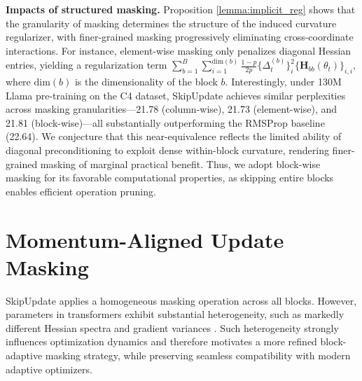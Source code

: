 \documentclass[11pt, a4paper, twocolumn, copyright, goog]{google}
\theoremstyle{plain}
\theoremstyle{definition}
\theoremstyle{remark}
\begin{document}
\textbf{Impacts of structured masking.}
Proposition \ref{lemma:implicit_reg} shows that the granularity of masking determines the structure of the induced curvature regularizer, with finer-grained masking progressively eliminating cross-coordinate interactions.
For instance, element-wise masking only penalizes diagonal Hessian entries, yielding a regularization term $\sum_{b=1}^B \sum_{i=1}^{\textrm{dim}(b)} \frac{1-p}{2p} \{ \Delta_t^{(b)} \}_{i}^2   \{ \mathbf{H}_{bb}(\theta_t) \}_{i,i},$ where $\textrm{dim}(b)$ is the dimensionality of the block $b$.
Interestingly, under 130M Llama pre-training on the C4 dataset, SkipUpdate achieves similar perplexities across masking granularities—21.78 (column-wise), 21.73 (element-wise), and 21.81 (block-wise)—all substantially outperforming the RMSProp baseline (22.64).
We conjecture that this near-equivalence reflects the limited ability of diagonal preconditioning to exploit dense within-block curvature, rendering finer-grained masking of marginal practical benefit.
Thus, we adopt block-wise masking for its favorable computational properties, as skipping entire blocks enables efficient operation pruning.







\section{Momentum-Aligned Update Masking} \label{sec:mainsection}
SkipUpdate applies a homogeneous masking operation across all blocks.
However, parameters in transformers exhibit substantial heterogeneity, such as markedly different Hessian spectra \citep{zhang2024transformers} and gradient variances \citep{orvieto2025search}. 
Such heterogeneity strongly influences optimization dynamics and therefore motivates a more refined block-adaptive masking strategy, while preserving seamless compatibility with modern adaptive optimizers.
\end{document}
